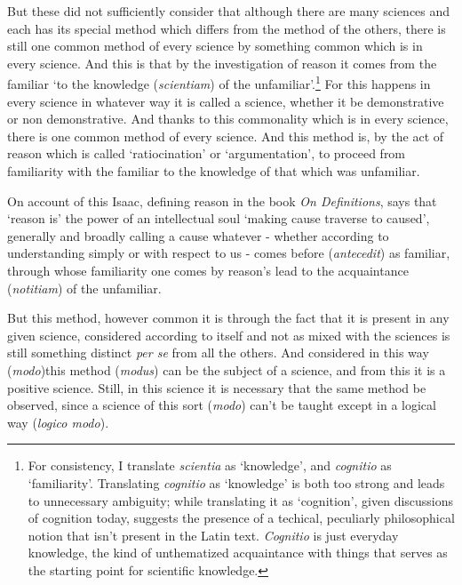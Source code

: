 \documentclass[]{article}
\begin{document}
But these did not sufficiently consider that although there are many sciences and each has its special method which differs from the method of the others, there is still one common method of every science by something common which is in every science. And this is that by the investigation of reason it comes from the familiar `to the knowledge (\textit{scientiam}) of the unfamiliar'.\footnote{For consistency, I translate \textit{scientia} as `knowledge', and \textit{cognitio} as `familiarity'. Translating \textit{cognitio} as `knowledge' is both too strong and leads to unnecessary ambiguity; while translating it as `cognition', given discussions of cognition today, suggests the presence of a techical, peculiarly philosophical notion that isn't present in the Latin text. \textit{Cognitio} is just everyday knowledge, the kind of unthematized acquaintance with things that serves as the starting point for scientific knowledge.} For this happens in every science in whatever way it is called a science, whether it be demonstrative or non demonstrative. And thanks to this commonality which is in every science, there is one common method of every science. And this method is, by the act of reason which is called `ratiocination' or `argumentation', to proceed from familiarity with the familiar to the knowledge of that which was unfamiliar.

On account of this Isaac, defining reason in the book \textit{On Definitions}, says that `reason is' the power of an intellectual soul `making cause traverse to caused', generally and broadly calling a cause whatever - whether according to understanding simply or with respect to us - comes before (\textit{antecedit}) as familiar, through whose familiarity one comes by reason's lead to the acquaintance (\textit{notitiam}) of the unfamiliar. 

But this method, however common it is through the fact that it is present in any given science, considered according to itself and not as mixed with the sciences is still something distinct \textit{per se} from all the others. And considered in this way (\textit{modo})this method (\textit{modus}) can be the subject of a science, and from this it is a positive science. Still, in this science it is necessary that the same method be observed, since a science of this sort (\textit{modo}) can't be taught except in a logical way (\textit{logico modo}).
\end{document}
